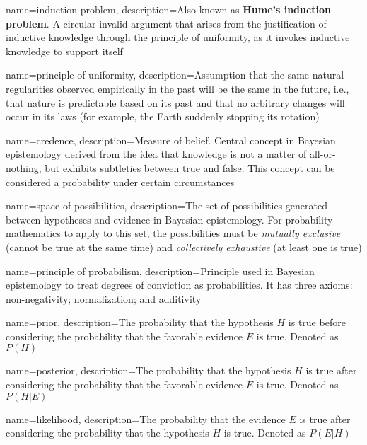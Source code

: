 {
    name=induction problem,
    description={Also known as \textbf{Hume's induction problem}. A circular invalid argument that arises from the justification of inductive knowledge through the principle of uniformity, as it invokes inductive knowledge to support itself}
}

{
    name=principle of uniformity,
    description={Assumption that the same natural regularities observed empirically in the past will be the same in the future, i.e., that nature is predictable based on its past and that no arbitrary changes will occur in its laws (for example, the Earth suddenly stopping its rotation)}
}

{
    name=credence,
    description={Measure of belief. Central concept in Bayesian epistemology derived from the idea that knowledge is not a matter of all-or-nothing, but exhibits subtleties between true and false. This concept can be considered a probability under certain circumstances}
}

{
    name=space of possibilities,
    description={The set of possibilities generated between hypotheses and evidence in Bayesian epistemology. For probability mathematics to apply to this set, the possibilities must be \textit{mutually exclusive} (cannot be true at the same time) and \textit{collectively exhaustive} (at least one is true)}
}

{
    name=principle of probabilism,
    description={Principle used in Bayesian epistemology to treat degrees of conviction as probabilities. It has three axioms: non-negativity; normalization; and additivity}
}

{
    name=prior,
    description={The probability that the hypothesis $H$ is true before considering the probability that the favorable evidence $E$ is true. Denoted as $P(H)$}
}

{
    name=posterior,
    description={The probability that the hypothesis $H$ is true after considering the probability that the favorable evidence $E$ is true. Denoted as $P(H | E)$}
}

{
    name=likelihood,
    description={The probability that the evidence $E$ is true after considering the probability that the hypothesis $H$ is true. Denoted as $P(E | H)$}
}

